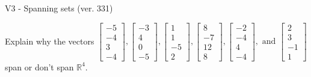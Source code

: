 \begin{exercise}
  \begin{exerciseTitle}V3 - Spanning sets (ver. 331)\end{exerciseTitle}
  \begin{exerciseStatement}
    Explain why the vectors \(\left[\begin{array}{r}
-5 \\
-4 \\
3 \\
-4
\end{array}\right] , \left[\begin{array}{r}
-3 \\
4 \\
0 \\
-5
\end{array}\right] , \left[\begin{array}{r}
1 \\
1 \\
-5 \\
2
\end{array}\right] , \left[\begin{array}{r}
8 \\
-7 \\
12 \\
8
\end{array}\right] , \left[\begin{array}{r}
-2 \\
-4 \\
4 \\
-4
\end{array}\right] , \text{ and } \left[\begin{array}{r}
2 \\
3 \\
-1 \\
1
\end{array}\right]\) span or don't span \(\mathbb{R}^4\). 
	



\end{exerciseStatement}
\end{exercise}
